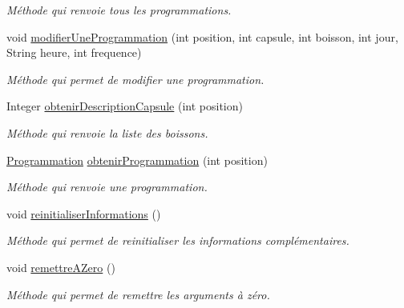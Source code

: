 \begin{DoxyCompactItemize}
\begin{DoxyCompactList}\small\item\em Méthode qui renvoie tous les programmations. \end{DoxyCompactList}\item 
void \hyperlink{classcom_1_1example_1_1ekawa_1_1_cafetiere_ae15274dce04b0f875727b29e573fc83f}{modifier\+Une\+Programmation} (int position, int capsule, int boisson, int jour, String heure, int frequence)
\begin{DoxyCompactList}\small\item\em Méthode qui permet de modifier une programmation. \end{DoxyCompactList}\item 
Integer \hyperlink{classcom_1_1example_1_1ekawa_1_1_cafetiere_ac9ff316ec5e971d52f595dc4594e7b5b}{obtenir\+Description\+Capsule} (int position)
\begin{DoxyCompactList}\small\item\em Méthode qui renvoie la liste des boissons. \end{DoxyCompactList}\item 
\hyperlink{classcom_1_1example_1_1ekawa_1_1_programmation}{Programmation} \hyperlink{classcom_1_1example_1_1ekawa_1_1_cafetiere_aaaaa95b5ed36da9d14f5aa60116a66b8}{obtenir\+Programmation} (int position)
\begin{DoxyCompactList}\small\item\em Méthode qui renvoie une programmation. \end{DoxyCompactList}\item 
void \hyperlink{classcom_1_1example_1_1ekawa_1_1_cafetiere_a18e77fd60191cc0b2c7e247f72807096}{reinitialiser\+Informations} ()
\begin{DoxyCompactList}\small\item\em Méthode qui permet de reinitialiser les informations complémentaires. \end{DoxyCompactList}\item 
void \hyperlink{classcom_1_1example_1_1ekawa_1_1_cafetiere_a10a040b45cfaac52cd5c26049bf2d7b7}{remettre\+A\+Zero} ()
\begin{DoxyCompactList}\small\item\em Méthode qui permet de remettre les arguments à zéro. \end{DoxyCompactList}\end{DoxyCompactItemize}
